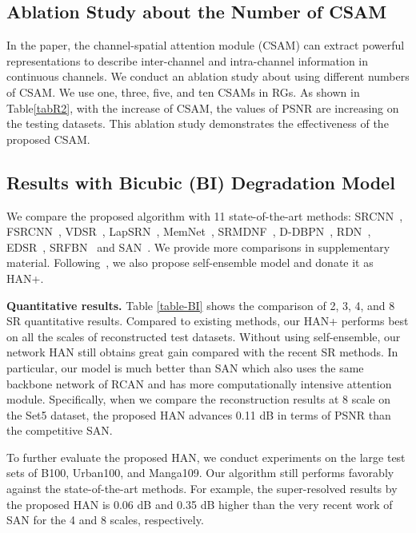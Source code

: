 \documentclass[runningheads]{llncs}
\begin{document}
\subsection{Ablation Study about the Number of CSAM}
In the paper, the channel-spatial attention module (CSAM) can extract powerful representations to describe inter-channel and intra-channel information in continuous channels. We conduct an ablation study about using different numbers of CSAM. We use one, three, five, and ten CSAMs in RGs. As shown in Table\ref{tabR2}, with the increase of CSAM, the values of PSNR are increasing on the testing datasets. 
This ablation study demonstrates the effectiveness of the proposed CSAM.




\subsection{Results with Bicubic (BI) Degradation Model}
We compare the proposed algorithm with 11 state-of-the-art methods: SRCNN~\cite{dong2014learning}, FSRCNN~\cite{dong2016accelerating}, VDSR~\cite{kim2016accurate}, LapSRN~\cite{lai2017deep}, MemNet~\cite{tai2017memnet}, SRMDNF~\cite{zhang2018learning}, D-DBPN~\cite{haris2018deep}, RDN~\cite{zhang2018residual}, EDSR~\cite{lim2017enhanced}, SRFBN~\cite{li2019feedback} and SAN~\cite{dai2019second}. We provide more comparisons in supplementary material.
Following~\cite{lim2017enhanced,dai2019second,zhang2018image},  we also propose self-ensemble model and donate it as HAN+.



\textbf{Quantitative results.} Table \ref{table-BI} shows the comparison of 2, 3, 4, and 8 SR quantitative results. Compared to existing methods, our HAN+ performs best on all the scales of reconstructed test datasets. Without using self-ensemble, our network HAN still obtains great gain compared with the recent SR methods. 
In particular, our model is much better than SAN which also uses the same backbone network of RCAN and has more computationally intensive attention module.
Specifically, when we compare the reconstruction results at 8 scale on the Set5 dataset, the proposed HAN advances 0.11 dB in terms of PSNR than the competitive SAN.





To further evaluate the proposed HAN, we conduct experiments on the large test sets of B100, Urban100, and Manga109. Our algorithm still performs favorably against the state-of-the-art methods. For example, the super-resolved results by the proposed HAN is 0.06 dB and 0.35 dB higher than the very recent work of SAN for the 4 and 8 scales, respectively.
\end{document}
